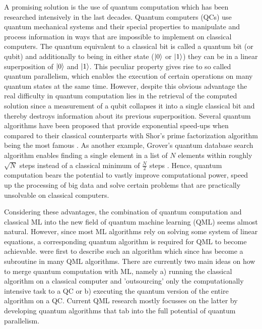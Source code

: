 \documentclass[a4paper]{article}
\newcommand*{\0}{$\ket{0}$}
\newcommand*{\1}{$\ket{1}$}
\begin{document}
A promising solution is the use of quantum computation which has been researched intensively in the last decades. Quantum computers (QCs) use quantum mechanical systems and their special properties to manipulate and process information in ways that are impossible to implement on classical computers. The quantum equivalent to a classical bit is called a quantum bit (or qubit) and additionally to being in either state (\0 or \1) they can be in a linear superposition of \0 and \1. This peculiar property gives rise to so called quantum parallelism, which enables the execution of certain operations on many quantum states at the same time. However, despite this obvious advantage the real difficulty in quantum computation lies in the retrieval of the computed solution since a measurement of a qubit collapses it into a single classical bit and thereby destroys information about its previous superposition. Several quantum algorithms have been proposed that provide exponential speed-ups when compared to their classical counterparts with Shor's prime factorization algorithm being the most famous \citep{shor1994}. As another example, Grover's quantum database search algorithm enables finding a single element in a list of $N$ elements within roughly $\sqrt{N}$ steps instead of a classical minimum of $\frac{N}{2}$ steps \citep{grover}. Hence, quantum computation bears the potential to vastly improve computational power, speed up the processing of big data and solve certain problems that are practically unsolvable on classical computers. 


Considering these advantages, the combination of quantum computation and classical ML into the new field of quantum machine learning (QML) seems almost natural. However, since most ML algorithms rely on solving some system of linear equations, a corresponding quantum algorithm is required for QML to become achievable. \cite{HHL2009} were first to describe such an algorithm which since has become a subroutine in many QML algorithms. There are currently two main ideas on how to merge quantum computation with ML, namely a) running the classical algorithm on a classical computer and 'outsourcing' only the computationally intensive task to a QC or b) executing the quantum version of the entire algorithm on a QC. Current QML research mostly focusses on the latter by developing quantum algorithms that tab into the full potential of quantum parallelism.
\end{document}
